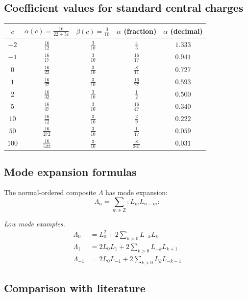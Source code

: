 \subsection{Coefficient values for standard central charges}

\begin{center}
\begin{tabular}{|c|c|c|c|c|}
\hline
$c$ & $\alpha(c) = \frac{16}{22+5c}$ & $\beta(c) = \frac{3}{10}$ & 
$\alpha$ (fraction) & $\alpha$ (decimal) \\
\hline
$-2$ & $\frac{16}{12}$ & $\frac{3}{10}$ & $\frac{4}{3}$ & $1.333$ \\
\hline
$-1$ & $\frac{16}{17}$ & $\frac{3}{10}$ & $\frac{16}{17}$ & $0.941$ \\
\hline
$0$ & $\frac{16}{22}$ & $\frac{3}{10}$ & $\frac{8}{11}$ & $0.727$ \\
\hline
$1$ & $\frac{16}{27}$ & $\frac{3}{10}$ & $\frac{16}{27}$ & $0.593$ \\
\hline
$2$ & $\frac{16}{32}$ & $\frac{3}{10}$ & $\frac{1}{2}$ & $0.500$ \\
\hline
$5$ & $\frac{16}{47}$ & $\frac{3}{10}$ & $\frac{16}{47}$ & $0.340$ \\
\hline
$10$ & $\frac{16}{72}$ & $\frac{3}{10}$ & $\frac{2}{9}$ & $0.222$ \\
\hline
$50$ & $\frac{16}{272}$ & $\frac{3}{10}$ & $\frac{1}{17}$ & $0.059$ \\
\hline
$100$ & $\frac{16}{522}$ & $\frac{3}{10}$ & $\frac{8}{261}$ & $0.031$ \\
\hline
\end{tabular}
\end{center}

\subsection{Mode expansion formulas}

The normal-ordered composite $\Lambda$ has mode expansion:
\[\Lambda_n = \sum_{m \in \mathbb{Z}} :L_m L_{n-m}:\]

\emph{Low mode examples.}
\begin{align}
\Lambda_0 &= L_0^2 + 2\sum_{k>0} L_{-k}L_k \\
\Lambda_1 &= 2L_0 L_1 + 2\sum_{k>0} L_{-k}L_{k+1} \\
\Lambda_{-1} &= 2L_0 L_{-1} + 2\sum_{k>0} L_k L_{-k-1}
\end{align}

\subsection{Comparison with literature}

